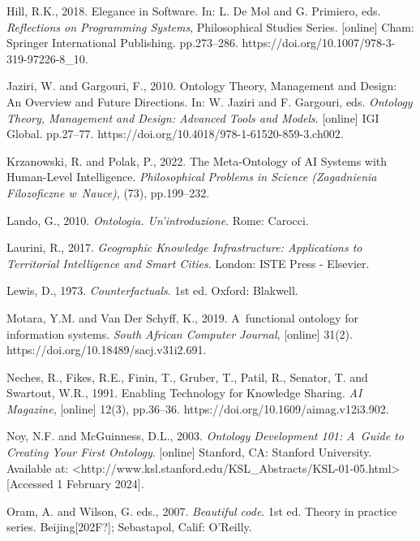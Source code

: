 Hill, R.K., 2018. Elegance in Software. In: L. De Mol and G. Primiero, eds. \textit{Reflections on Programming Systems}, Philosophical Studies Series. [online] Cham: Springer International Publishing. pp.273–286. https://doi.org/10.1007/978-3-319-97226-8\_10.



Jaziri, W. and Gargouri, F., 2010. Ontology Theory, Management and Design: An Overview and Future Directions. In: W. Jaziri and F. Gargouri, eds. \textit{Ontology Theory, Management and Design: Advanced Tools and Models}. [online] IGI Global. pp.27–77. https://doi.org/10.4018/978-1-61520-859-3.ch002.



Krzanowski, R. and Polak, P., 2022. The Meta-Ontology of AI Systems with Human-Level Intelligence. \textit{Philosophical Problems in Science (Zagadnienia Filozoficzne w~Nauce)}, (73), pp.199–232.



Lando, G., 2010. \textit{Ontologia. Un'introduzione}. Rome: Carocci.



Laurini, R., 2017. \textit{Geographic Knowledge Infrastructure: Applications to Territorial Intelligence and Smart Cities}. London: ISTE Press - Elsevier.



Lewis, D., 1973. \textit{Counterfactuals}. 1st ed. Oxford: Blakwell.



Motara, Y.M. and Van Der Schyff, K., 2019. A~functional ontology for information systems. \textit{South African Computer Journal}, [online] 31(2). https://doi.org/10.18489/sacj.v31i2.691.



Neches, R., Fikes, R.E., Finin, T., Gruber, T., Patil, R., Senator, T. and Swartout, W.R., 1991. Enabling Technology for Knowledge Sharing. \textit{AI Magazine}, [online] 12(3), pp.36–36. https://doi.org/10.1609/aimag.v12i3.902.



Noy, N.F. and McGuinness, D.L., 2003. \textit{Ontology Development 101: A~Guide to Creating Your First Ontology}. [online] Stanford, CA: Stanford University. Available at: {\textless}http://www.ksl.stanford.edu/KSL\_Abstracts/KSL-01-05.html{\textgreater} [Accessed 1 February 2024].



Oram, A. and Wilson, G. eds., 2007. \textit{Beautiful code}. 1st ed. Theory in practice series. Beijing[202F?]; Sebastapol, Calif: O'Reilly.



